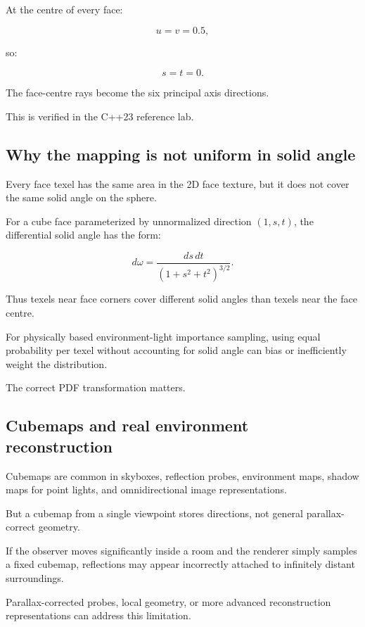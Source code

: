 At the centre of every face:

\[ u=v=0.5, \]

so:

\[ s=t=0. \]

The face-centre rays become the six principal axis directions.

This is verified in the C++23 reference lab.

\subsection{Why the mapping is not uniform in solid angle}\label{02-foundations-ii-ch035-why-the-mapping-is-not-uniform-in-solid-angle}

Every face texel has the same area in the 2D face texture, but it does not cover the same solid angle on the sphere.

For a cube face parameterized by unnormalized direction \((1,s,t)\), the differential solid angle has the form:

\[ \boxed{ d\omega= \frac{ds\,dt} {(1+s^2+t^2)^{3/2}}. } \]

Thus texels near face corners cover different solid angles than texels near the face centre.

For physically based environment-light importance sampling, using equal probability per texel without accounting for solid angle can bias or inefficiently weight the distribution.

The correct PDF transformation matters.

\subsection{Cubemaps and real environment reconstruction}\label{02-foundations-ii-ch035-cubemaps-and-real-environment-reconstruction}

Cubemaps are common in skyboxes, reflection probes, environment maps, shadow maps for point lights, and omnidirectional image representations.

But a cubemap from a single viewpoint stores directions, not general parallax-correct geometry.

If the observer moves significantly inside a room and the renderer simply samples a fixed cubemap, reflections may appear incorrectly attached to infinitely distant surroundings.

Parallax-corrected probes, local geometry, or more advanced reconstruction representations can address this limitation.

